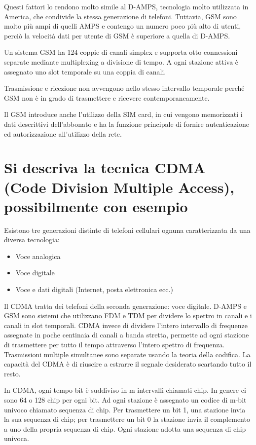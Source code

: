 Questi fattori lo rendono molto simile al D-AMPS, tecnologia molto utilizzata in America, che condivide la stessa generazione di telefoni. Tuttavia, GSM sono molto più ampi di quelli AMPS e contengo un numero poco più alto di utenti, perciò la velocità dati per utente di GSM è superiore a quella di D-AMPS.

Un sistema GSM ha 124 coppie di canali simplex e supporta otto connessioni separate mediante multiplexing a divisione di tempo.
A ogni stazione attiva è assegnato uno slot temporale su una coppia di canali.

Trasmissione e ricezione non avvengono nello stesso intervallo temporale perché GSM non è in grado di trasmettere e ricevere contemporaneamente.

Il GSM introduce anche l’utilizzo della SIM card, in cui vengono memorizzati i dati descrittivi dell’abbonato e ha la funzione principale di fornire autenticazione ed autorizzazione all’utilizzo della rete.

\section{Si descriva la tecnica CDMA (Code Division Multiple Access), possibilmente con esempio}
Esistono tre generazioni distinte di telefoni cellulari ognuna caratterizzata da una diversa tecnologia:
\begin{itemize}
\item	Voce analogica
\item	Voce digitale
\item	Voce e dati digitali (Internet, posta elettronica ecc.)
\end{itemize}
Il CDMA tratta dei telefoni della seconda generazione: voce digitale.
D-AMPS e GSM sono sistemi che utilizzano FDM e TDM per dividere lo spettro in canali e i canali in slot temporali. CDMA invece di dividere l’intero intervallo di frequenze assegnate in poche centinaia di canali a banda stretta, permette ad ogni stazione di trasmettere per tutto il tempo attraverso l’intero spettro di frequenza. Trasmissioni multiple simultanee sono separate usando la teoria della codifica. La capacità del CDMA è di riuscire a estrarre il segnale desiderato scartando tutto il resto.

In CDMA, ogni tempo bit è suddiviso in m intervalli chiamati chip. In genere ci sono 64 o 128 chip per ogni bit. Ad ogni stazione è assegnato un codice di m-bit univoco chiamato sequenza di chip.
Per trasmettere un bit 1, una stazione invia la sua sequenza di chip; per trasmettere un bit 0 la stazione invia il complemento a uno della propria sequenza di chip.
Ogni stazione adotta una sequenza di chip univoca.

